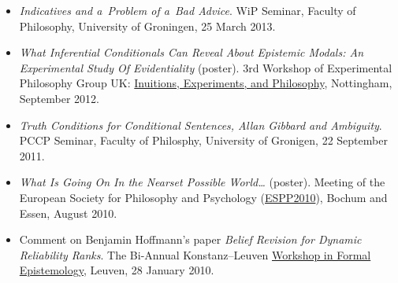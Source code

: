 \documentclass[a4paper,12pt]{article}
\begin{document}
\begin{small}
\begin{itemize}
  \item \emph{Indicatives and a~Problem of a~Bad Advice}. WiP
    Seminar, Faculty of Philosophy, University of Groningen, 25 March
    2013.
    
  \item \emph{What Inferential Conditionals Can Reveal About Epistemic
      Modals: An Experimental Study Of Evidentiality} (poster).
    3rd Workshop of Experimental Philosophy Group UK:
    \href{https://www.nottingham.ac.uk/philosophy/research/conferences/workshop-intuitions-experimentsandphilosophy.aspx}{Inuitions, Experiments, and Philosophy}, Nottingham, September 2012.

  \item \emph{Truth Conditions for Conditional Sentences, Allan
      Gibbard and Ambiguity}. PCCP Seminar, Faculty of
    Philosphy, University of Gronigen, 22 September 2011.
    
  \item \emph{What Is Going On In the Nearset Possible World\ldots} (poster). 
  Meeting of the European Society for Philosophy and  Psychology
    (\href{http://www.ruhr-uni-bochum.de/philosophy/espp2010/index.html}{ESPP2010}),
    Bochum and Essen, August 2010.

  \item Comment on Benjamin Hoffmann's paper \emph{Belief Revision for
      Dynamic Reliability Ranks}. The Bi-Annual Konstanz--Leuven
    \href{http://formalphilosophy.org/node/580}{Workshop in Formal
      Epistemology}, Leuven, 28 January 2010.
  \end{itemize}

  



  

\end{small}
\end{document}
